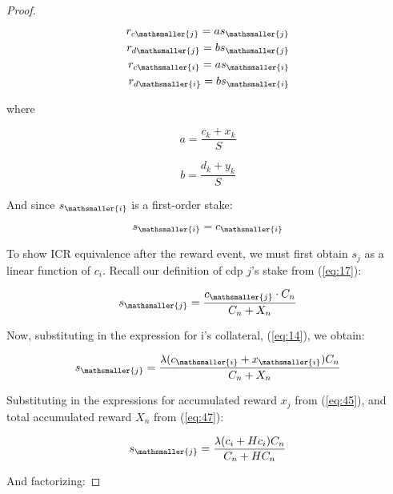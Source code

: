 \documentclass[reqno]{article}
\begin{document}
\begin{proof}
\begin{equation} \label{eq:20}
    \begin{split}
        r_{c\mathsmaller{j}}=as_\mathsmaller{j}\\
        r_{d\mathsmaller{j}}=bs_\mathsmaller{j}\\
        r_{c\mathsmaller{i}}=as_\mathsmaller{i}\\
        r_{d\mathsmaller{i}}=bs_\mathsmaller{i}
    \end{split}
\end{equation}

\bigskip
where

\begin{equation} \label{eq:20_a}
    a=\frac{c_k+x_k}{S}
\end{equation}

\begin{equation} \label{eq:20_b}
    b=\frac{d_k+y_k}{S}
\end{equation}

\bigskip
And since $s_\mathsmaller{i}$ is a first-order stake:

\begin{equation} \label{eq:21}
    s_\mathsmaller{i}=c_\mathsmaller{i}
\end{equation}

\bigskip
To show ICR equivalence after the reward event, we must first obtain $s_j$ as a linear function of $c_i$. Recall our definition of cdp $j$’s stake from (\ref{eq:17}):

\begin{equation} 
    s_\mathsmaller{j}=\frac{c_\mathsmaller{j} \cdot C_n}{C_n+X_n}
\end{equation}

\bigskip
Now, substituting in the expression for i’s collateral, (\ref{eq:14}), we obtain:

\begin{equation} 
    s_\mathsmaller{j}=\frac{\lambda(c_\mathsmaller{i}+x_\mathsmaller{i})C_n}{C_n+X_n}
\end{equation}


\bigskip
Substituting in the expressions for accumulated reward $x_j$ from (\ref{eq:45}), and total accumulated reward $X_n$ from (\ref{eq:47}):

\begin{equation} 
    s_\mathsmaller{j}=\frac{\lambda(c_i+Hc_i)C_n}{C_n+HC_n}
\end{equation}

\bigskip
And factorizing:


\end{proof}
\end{document}
